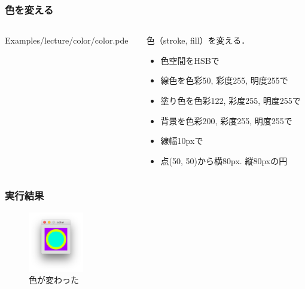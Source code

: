 \documentclass[dvipdfmx]{beamer}
\begin{document}
        \begin{frame}
            \frametitle{色を変える}
            \begin{columns}[c]
                \begin{column}{0.50\textwidth}
                    \tiny
                    Examples/lecture/color/color.pde
                    \scriptsize
                \end{column}
                \begin{column}{0.50\textwidth}
                    \begin{block}{色（stroke, fill）を変える．}
                        \begin{itemize}
                            \item 色空間をHSBで
                            \item 線色を色彩50, 彩度255, 明度255で
                            \item 塗り色を色彩122, 彩度255, 明度255で
                            \item 背景を色彩200, 彩度255, 明度255で
                            \item 線幅10pxで
                            \item 点(50, 50)から横80px. 縦80pxの円
                        \end{itemize}
                    \end{block}
                \end{column}
            \end{columns}
        \end{frame}

        \begin{frame}
            \frametitle{実行結果}
                \begin{figure}[htb]
                    \includegraphics[width=24mm]{images/09.png}
                    \caption{色が変わった}
                    \label{fig:09}
                \end{figure}
        \end{frame}
\end{document}

